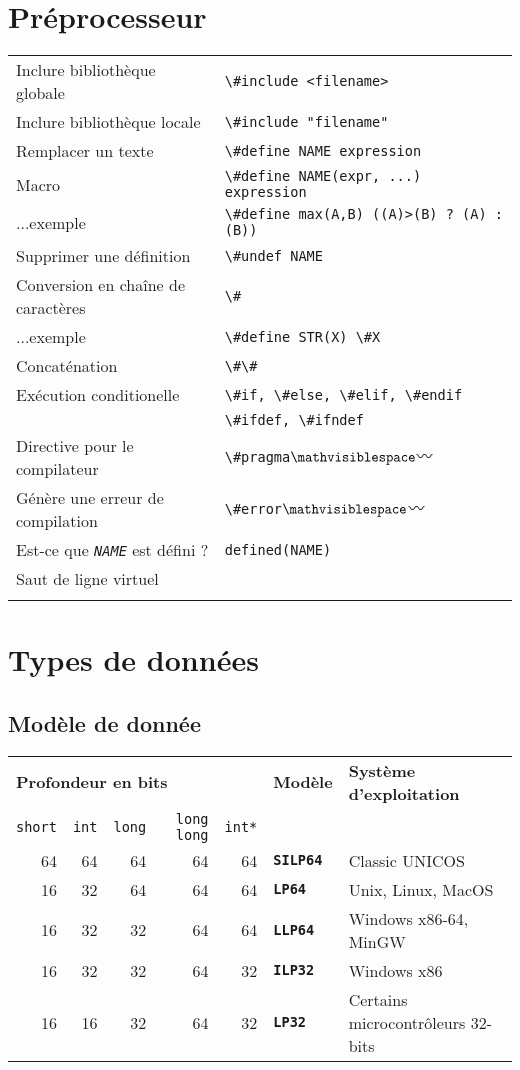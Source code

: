\documentclass{article}
\newcommand{\NAME}{\emph{NAME}}
\newcommand{\any}{$\hzigzag$~}
\newcommand{\spc}{$\mathvisiblespace$}
\newcommand{\cd}{\lstinline}
\begin{document}
\begin{multicols*}{3}
\section*{Préprocesseur}
\begin{tabularx}{\linewidth}{Xl}
  Inclure bibliothèque globale       & \cd{\#include <filename>} \\
  Inclure bibliothèque locale        & \cd{\#include "filename"} \\
  Remplacer un texte                 & \cd{\#define NAME expression} \\
  Macro                              & \cd{\#define NAME(expr, ...) expression} \\
  ...exemple                         & \cd{\#define max(A,B) ((A)>(B) ? (A) : (B))} \\
  Supprimer une définition           & \cd{\#undef NAME} \\
  Conversion en chaîne de caractères & \cd{\#} \\
  ...exemple                         & \cd{\#define STR(X) \#X} \\
  Concaténation                      & \cd{\#\#} \\
  Exécution conditionelle            & \cd{\#if, \#else, \#elif, \#endif} \\
                                     & \cd{\#ifdef, \#ifndef} \\
  Directive pour le compilateur      & \cd{\#pragma}\tt\spc \any \\
  Génère une erreur de compilation   & \cd{\#error}\tt\spc \any \\
  Est-ce que \texttt{\NAME} est défini ? & \cd{defined(NAME)} \\
  Saut de ligne virtuel              & \cd{\\}
\end{tabularx}

\section*{Types de données}

\subsection*{Modèle de donnée}
\begin{tabularx}{\linewidth}{r|r|r|r|r|l|X}
  \multicolumn{5}{l|}{\bf Profondeur en bits} & \bf Modèle & \bf Système d'exploitation \\
  \cd {short} & \cd{int} & \cd{long} & \cd{long long} & \cd{int*} & & \\
  \hline
  64 & 64 & 64 & 64 & 64 & \bf \tt SILP64 & Classic UNICOS\\
  16 & 32 & 64 & 64 & 64 & \bf \tt LP64   & Unix, Linux, MacOS \\
  16 & 32 & 32 & 64 & 64 & \bf \tt LLP64  & Windows x86-64, MinGW \\
  16 & 32 & 32 & 64 & 32 & \bf \tt ILP32  & Windows x86 \\
  16 & 16 & 32 & 64 & 32 & \bf \tt LP32   & Certains microcontrôleurs 32-bits\\
\end{tabularx}


\end{multicols*}
\end{document}
